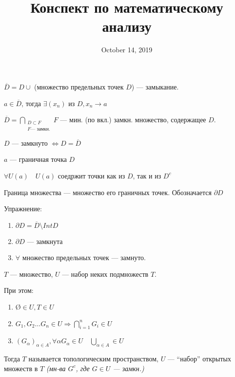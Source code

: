 

\title{Конспект по математическому анализу}

\date{October 14, 2019}



\maketitle
 
\noindent
$\overline D=D\cup $ (множество предельных точек $D$) --- замыкание.

\begin{remark}
$a\in\overline D$, тогда $\exists (x_n)$ из $D, x_n\to a$
\end{remark}

\begin{remark}
$\overline D = \bigcap\limits_{\substack{D\subset F \\ F \text{--- замкн.}}} F$ --- мин. (по вкл.) замкн. множество, содержащее $D$.
\end{remark}

\begin{remark}
$D$ --- замкнуто $\Leftrightarrow D=\overline D$
\end{remark}

\begin{definition}
$a$ --- граничная точка $D$

$\forall U(a) \quad U(a)$ соедржит точки как из $D$, так и из $D^c$
\end{definition}

\begin{definition}
Граница множества --- множество его граничных точек. Обозначается $\partial D$
\end{definition}

Упражнение:
\begin{enumerate}
    \item $\partial D=\overline D \setminus IntD$
    \item $\partial D$ --- замкнута
    \item $\forall$ множество предельных точек --- замнуто.
\end{enumerate}

\begin{definition}
$T$ --- множество, $U$ --- набор неких подмножеств $T$.

При этом: \begin{enumerate}
    \item \O$\in U, T\in U$
    \item $G_1,G_2\ldots G_n\in U \Rightarrow \bigcap\limits_{i=1}^n G_i\in U$
    \item $(G_\alpha)_{\alpha\in A}, \forall \alpha G_\alpha\in U \quad \bigcup\limits_{\alpha\in A}\in U$
\end{enumerate}
Тогда $T$ называется топологическим пространством, $U$ --- ``набор'' открытых множеств в $T$ \textit{(мн-ва $G^c$, где $G\in U$ --- замкн.)}
\end{definition}

